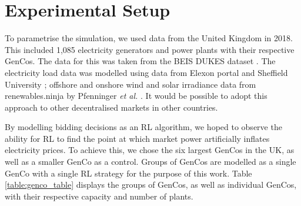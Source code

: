 





\section{Experimental Setup}
\label{rl:sec:methodology}


To parametrise the simulation, we used data from the United Kingdom in 2018. This included 1,085 electricity generators and power plants with their respective GenCos. The data for this was taken from the BEIS DUKES dataset \cite{dukes_511}. The electricity load data was modelled using data from Elexon portal and Sheffield University \cite{gbnationalgridstatus2019}; offshore and onshore wind and solar irradiance data from renewables.ninja by Pfenninger \textit{et al.} \cite{Pfenninger2016}. It would be possible to adopt this approach to other decentralised markets in other countries.

By modelling bidding decisions as an RL algorithm, we hoped to observe the ability for RL to find the point at which market power artificially inflates electricity prices. To achieve this, we chose the six largest GenCos in the UK, as well as a smaller GenCo as a control. Groups of GenCos are modelled as a single GenCo with a single RL strategy for the purpose of this work. Table \ref{table:genco_table} displays the groups of GenCos, as well as individual GenCos, with their respective capacity and number of plants.





